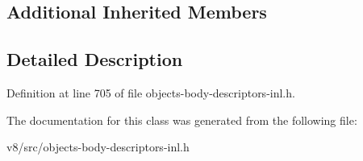 \subsection*{Additional Inherited Members}


\subsection{Detailed Description}


Definition at line 705 of file objects-\/body-\/descriptors-\/inl.\+h.



The documentation for this class was generated from the following file\+:\begin{DoxyCompactItemize}
\item 
v8/src/objects-\/body-\/descriptors-\/inl.\+h\end{DoxyCompactItemize}
